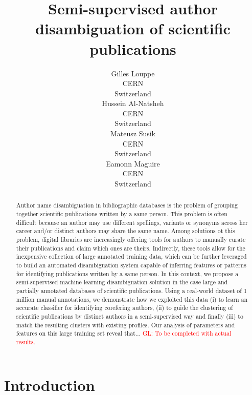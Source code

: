 \documentclass{article}
\title{Semi-supervised author disambiguation of scientific publications}
\author{Gilles Louppe\\
        CERN\\
        Switzerland\\
\And Hussein Al-Natsheh\\
        CERN\\
        Switzerland\\
\And Mateusz Susik\\
        CERN\\
        Switzerland\\
\And Eamonn Maguire\\
        CERN\\
        Switzerland}
\date{}
\newcommand{\glnote}[1]{\textcolor{red}{GL: #1}}
\begin{document}
\maketitle

\begin{abstract}

Author name disambiguation in bibliographic databases is the problem of
grouping together scientific publications written by a same person. This
problem is often difficult because an author may use different spellings,
variants or synonyms across her career and/or distinct authors may share the
same name. Among solutions ot this problem, digital libraries are increasingly
offering tools for authors to manually curate their publications and claim
which ones are theirs. Indirectly, these tools allow for the inexpensive
collection of large annotated training data, which can be further leveraged to
build an automated disambiguation system capable of inferring features or
patterns for identifying publications written by a same person.  In this
context, we propose a semi-supervised machine learning disambiguation solution
in the case large and partially annotated databases of scientific publications.
Using a real-world dataset of 1 million manual annotations, we demonstrate how
we exploited this data (i) to learn an accurate classifier for identifying
corefering authors, (ii) to guide the clustering of scientific publications by
distinct authors in a semi-supervised way and finally (iii) to match the
resulting clusters with existing profiles.  Our analysis of parameters and
features on this large training set reveal that... \glnote{To be completed with
actual results.}

\end{abstract}



\section{Introduction}
\label{introduction}

\end{document}
